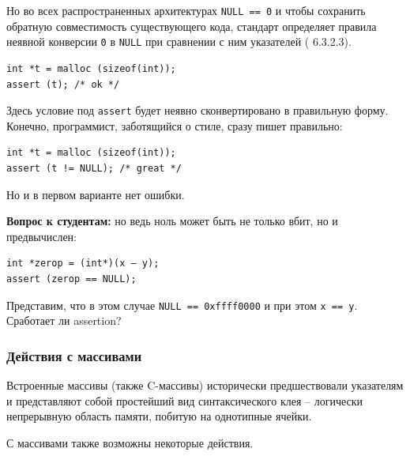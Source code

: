 \documentclass[a4paper,12pt,oneside]{article}
\newif\ifanswers
\begin{document}
Но во всех распространенных архитектурах \lstinline!NULL == 0! и чтобы сохранить обратную совместимость существующего кода, стандарт определяет правила неявной конверсии \lstinline!0! в \lstinline!NULL! при сравнении с ним указателей (\cite{stdc99} 6.3.2.3).

\begin{lstlisting}
int *t = malloc (sizeof(int));
assert (t); /* ok */
\end{lstlisting}

Здесь условие под \lstinline!assert! будет неявно сконвертировано в правильную форму. Конечно, программист, заботящийся о стиле, сразу пишет правильно:

\begin{lstlisting}
int *t = malloc (sizeof(int));
assert (t != NULL); /* great */
\end{lstlisting}

Но и в первом варианте нет ошибки.

\textbf{Вопрос к студентам:} но ведь ноль может быть не только вбит, но и предвычислен:

\begin{lstlisting}
int *zerop = (int*)(x – y);
assert (zerop == NULL);
\end{lstlisting}

Представим, что в этом случае \lstinline!NULL == 0xffff0000! и при этом \lstinline!x == y!. Сработает ли assertion?

\ifanswers
Правильный ответ: увы, нет. Стандарт гарантирует стабильное обращение с нулями времени компиляции, но не нулями времени исполнения (\cite{stdc99} 6.3.2.3), иначе проверками пришлось бы завешивать слишком много кода.
\fi

\subsubsection{Действия с массивами}

Встроенные массивы (также C-массивы) исторически предшествовали указателям и представляют собой простейший вид синтаксического клея -- логически непрерывную область памяти, побитую на однотипные ячейки.

С массивами также возможны некоторые действия.
\end{document}
